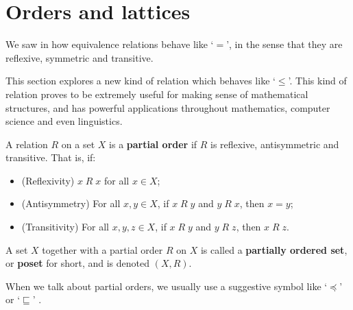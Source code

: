 \section{Orders and lattices}
\label{secPosets}
\label{secOrdersLattices}

We saw in  how equivalence relations behave like `$=$', in the sense that they are reflexive, symmetric and transitive. 

This section explores a new kind of relation which behaves like `$\le$'. This kind of relation proves to be extremely useful for making sense of mathematical structures, and has powerful applications throughout mathematics, computer science and even linguistics.

\begin{definition}
\label{defPartialOrder}
A relation $R$ on a set $X$ is a \textbf{partial order} if $R$ is reflexive, antisymmetric and transitive. That is, if:
\begin{itemize}
\item (Reflexivity) $x\; R\; x$ for all $x \in X$;
\item (Antisymmetry) For all $x,y \in X$, if $x\; R\; y$ and $y\; R\; x$, then $x=y$;
\item (Transitivity) For all $x,y,z \in X$, if $x\; R\; y$ and $y\; R\; z$, then $x\; R\; z$.
\end{itemize}
A set $X$ together with a partial order $R$ on $X$ is called a \textbf{partially ordered set}, or \textbf{poset} for short, and is denoted $(X,R)$.
\end{definition}

When we talk about partial orders, we usually use a suggestive symbol like `$\preceq$'  or `$\sqsubseteq$' .

